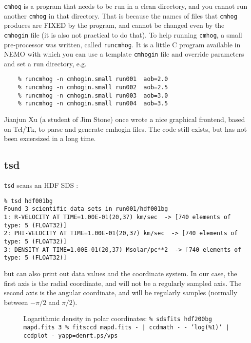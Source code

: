 \documentclass[11pt]{article}
\begin{document}
{\tt cmhog} is a program that needs to be run in a clean directory, and you
cannot run another {\tt cmhog} in that directory. That is because the names
of files that {\tt cmhog} produces are FIXED by the program, and cannot be
changed even by the {\tt cmhogin} file (it is also not practical to do that).
To help running {\tt cmhog}, a small pre-processor was written, called
{\tt runcmhog}. It is a little C program available in NEMO with which you
can use a template {\tt cmhogin} file and override parameters and set
a run directory, e.g.

\begin{verbatim}
    % runcmhog -n cmhogin.small run001  aob=2.0
    % runcmhog -n cmhogin.small run002  aob=2.5
    % runcmhog -n cmhogin.small run003  aob=3.0
    % runcmhog -n cmhogin.small run004  aob=3.5
\end{verbatim}

Jianjun Xu (a student of Jim Stone) once wrote a nice graphical frontend,
based on Tcl/Tk, to parse and generate cmhogin files. The code still
exists, but has not been excersized in a long time.

\subsection{tsd}

{\tt tsd} scans an HDF SDS :
\footnotesize\begin{verbatim}
% tsd hdf001bg 
Found 3 scientific data sets in run001/hdf001bg
1: R-VELOCITY AT TIME=1.00E-01(20,37) km/sec  -> [740 elements of type: 5 (FLOAT32)]
2: PHI-VELOCITY AT TIME=1.00E-01(20,37) km/sec  -> [740 elements of type: 5 (FLOAT32)]
3: DENSITY AT TIME=1.00E-01(20,37) Msolar/pc**2  -> [740 elements of type: 5 (FLOAT32)]
\end{verbatim}\normalsize

but can also print out data values and the coordinate system. In our case, the
first axis is the radial coordinate, and will not be a regularly sampled axis. The
second axis is the angular coordinate, and will be regularly samples
(normally between $-\pi/2$ and $\pi/2$).

\begin{figure}[htbp]
\epsfysize=5cm
\caption{
Logarithmic density in polar coordinates:\newline
  \tt \% sdsfits hdf200bg mapd.fits 3\newline
  \tt \% fitsccd mapd.fits - | ccdmath - - 'log(\%1)' | ccdplot - yapp=denrt.ps/vps
}

\end{figure}
\end{document}
